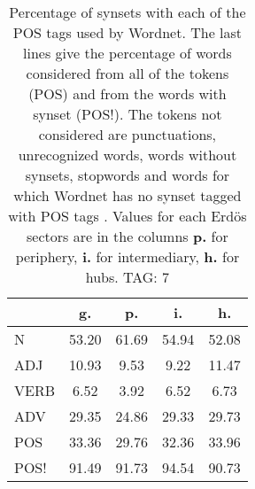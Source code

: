 \begin{table}[h!]
\begin{center}
\begin{tabular}{| l || c | c | c | c |}\hline
 & {\bf g.} & {\bf p.} & {\bf i.} & {\bf h.} \\\hline\hline
N & 53.20  & 61.69  & 54.94  & 52.08 \\\hline
ADJ & 10.93  & 9.53  & 9.22  & 11.47 \\\hline
VERB & 6.52  & 3.92  & 6.52  & 6.73 \\\hline
ADV & 29.35  & 24.86  & 29.33  & 29.73 \\\hline\hline
POS & 33.36  & 29.76  & 32.36  & 33.96 \\\hline
POS! & 91.49  & 91.73  & 94.54  & 90.73 \\\hline
\end{tabular}
\caption{Percentage of synsets with each of the POS tags used by Wordnet. The last lines give the percentage of words considered from all of the tokens (POS) and from the words with synset (POS!). The tokens not considered are punctuations, unrecognized words, words without synsets, stopwords and words for which Wordnet has no synset  tagged with POS tags . Values for each Erd\"os sectors are in the columns {{\bf p.}} for periphery, {{\bf i.}} for intermediary, {{\bf h.}} for hubs. TAG: 7}
\end{center}
\end{table}